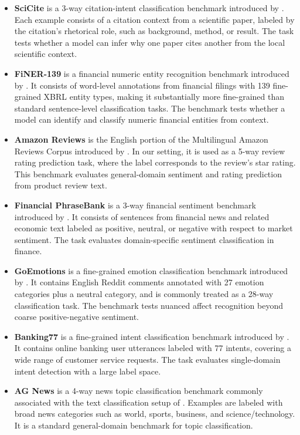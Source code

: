 \begin{itemize}[leftmargin=*,itemsep=2pt,topsep=2pt]
\item \textbf{SciCite} is a 3-way citation-intent classification benchmark introduced by \citet{cohan2019structuralscaffoldscitationintent}. Each example consists of a citation context from a scientific paper, labeled by the citation's rhetorical role, such as background, method, or result. The task tests whether a model can infer why one paper cites another from the local scientific context.
\item \textbf{FiNER-139} is a financial numeric entity recognition benchmark introduced by \citet{Loukas_2022}. It consists of word-level annotations from financial filings with 139 fine-grained XBRL entity types, making it substantially more fine-grained than standard sentence-level classification tasks. The benchmark tests whether a model can identify and classify numeric financial entities from context.
\item \textbf{Amazon Reviews} is the English portion of the Multilingual Amazon Reviews Corpus introduced by \citet{keung2020multilingualamazonreviewscorpus}. In our setting, it is used as a 5-way review rating prediction task, where the label corresponds to the review's star rating. This benchmark evaluates general-domain sentiment and rating prediction from product review text.
\item \textbf{Financial PhraseBank} is a 3-way financial sentiment benchmark introduced by \citet{malo2013gooddebtbaddebt}. It consists of sentences from financial news and related economic text labeled as positive, neutral, or negative with respect to market sentiment. The task evaluates domain-specific sentiment classification in finance.
\item \textbf{GoEmotions} is a fine-grained emotion classification benchmark introduced by \citet{demszky2020goemotionsdatasetfinegrainedemotions}. It contains English Reddit comments annotated with 27 emotion categories plus a neutral category, and is commonly treated as a 28-way classification task. The benchmark tests nuanced affect recognition beyond coarse positive-negative sentiment.
\item \textbf{Banking77} is a fine-grained intent classification benchmark introduced by \citet{casanueva2020efficientintentdetectiondual}. It contains online banking user utterances labeled with 77 intents, covering a wide range of customer service requests. The task evaluates single-domain intent detection with a large label space.
\item \textbf{AG News} is a 4-way news topic classification benchmark commonly associated with the text classification setup of \citet{zhang2016characterlevelconvolutionalnetworkstext}. Examples are labeled with broad news categories such as world, sports, business, and science/technology. It is a standard general-domain benchmark for topic classification.

\end{itemize}
